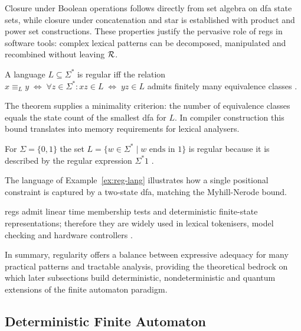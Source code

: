 Closure under Boolean operations follows directly from set algebra on \gls{dfa} state sets,  
while closure under concatenation and star is established with product and power set constructions.  
These properties justify the pervasive role of \glspl{reg} in software tools:  
complex lexical patterns can be decomposed, manipulated and recombined without leaving ${\cal R}$.  

\begin{theorem}\label{thm:myhill-nerode}
A language $L\subseteq\Sigma^{\ast}$ is regular  
iff the relation
$x\equiv_{L}y \;\Longleftrightarrow\; \forall z\in\Sigma^{\ast}\colon  
xz\in L \;\Leftrightarrow\; yz\in L$
admits finitely many equivalence classes \cite{hopcroft2001introduction}.  
\end{theorem}

The theorem supplies a minimality criterion:  
the number of equivalence classes equals the state count of the smallest \gls{dfa} for $L$.  
In compiler construction this bound translates into memory requirements for lexical analysers.  

\begin{example}\label{ex:reg-lang}
For $\Sigma=\{0,1\}$ the set
$L=\{w\in\Sigma^{\ast}\mid w\text{ ends in }1\}$ is regular because it
is described by the regular expression $\Sigma^{\ast}1$ \cite{hopcroft2001introduction}.  
\end{example}

The language of Example~\ref{ex:reg-lang} illustrates how a single positional constraint  
is captured by a two-state \gls{dfa}, matching the Myhill-Nerode bound.  

\begin{observation}
  \label{obs:why-regular-matters}
\glspl{reg} admit linear time membership tests and deterministic
finite-state representations; therefore they are widely used in lexical
tokenisers, model checking and hardware controllers \cite{aho1974design}.  
\end{observation}

In summary, regularity offers a balance between expressive adequacy for many practical patterns  
and tractable analysis, providing the theoretical bedrock on which later subsections build deterministic,  
nondeterministic and quantum extensions of the finite automaton paradigm.

\subsection{Deterministic Finite Automaton}\label{subsec:dfa}

